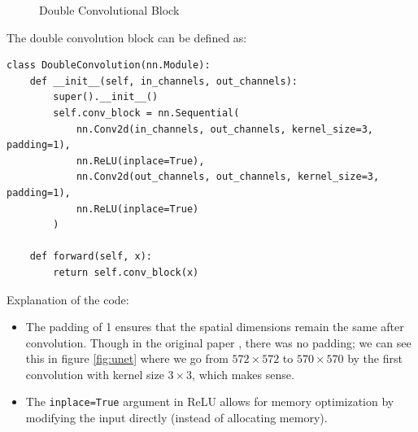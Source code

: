 \documentclass{article}
\begin{document}
\begin{figure}[H]
    \centering
    \caption{Double Convolutional Block}
\end{figure}

The double convolution block can be defined as:

\begin{verbatim}
class DoubleConvolution(nn.Module):
    def __init__(self, in_channels, out_channels):
        super().__init__()
        self.conv_block = nn.Sequential(
            nn.Conv2d(in_channels, out_channels, kernel_size=3, padding=1),
            nn.ReLU(inplace=True),
            nn.Conv2d(out_channels, out_channels, kernel_size=3, padding=1),
            nn.ReLU(inplace=True)
        )
    
    def forward(self, x):
        return self.conv_block(x)
\end{verbatim}

Explanation of the code:

\begin{itemize}
    \item The padding of 1 ensures that the spatial dimensions remain the same after convolution. Though in the original paper \cite{unet}, there was no padding; we can see this in figure \ref{fig:unet} where we go from $572 \times 572$ to $570 \times 570$ by the first convolution with kernel size $3 \times 3$, which makes sense.
    
    \item The \texttt{inplace=True} argument in ReLU allows for memory optimization by modifying the input directly (instead of allocating memory).
\end{itemize}
\end{document}
